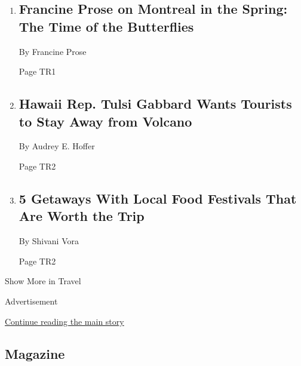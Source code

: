 \begin{enumerate}
\def\labelenumi{\arabic{enumi}.}
\item
  \href{/2018/06/11/travel/francine-prose-montreal-family-travel.html}{}

  \hypertarget{francine-prose-on-montreal-in-the-spring-the-time-of-the-butterflies}{%
  \subsection{Francine Prose on Montreal in the Spring: The Time of the
  Butterflies}\label{francine-prose-on-montreal-in-the-spring-the-time-of-the-butterflies}}

  By Francine Prose

  Page TR1
\item
  \href{/2018/06/05/travel/hawaii-gabbard-volcano.html}{}

  \hypertarget{hawaii-rep-tulsi-gabbard-wants-tourists-to-stay-away-from-volcano}{%
  \subsection{Hawaii Rep. Tulsi Gabbard Wants Tourists to Stay Away from
  Volcano}\label{hawaii-rep-tulsi-gabbard-wants-tourists-to-stay-away-from-volcano}}

  By Audrey E. Hoffer

  Page TR2
\item
  \href{/2018/06/13/travel/food-festivals-hotels.html}{}

  \hypertarget{5-getaways-with-local-food-festivals-that-are-worth-the-trip}{%
  \subsection{5 Getaways With Local Food Festivals That Are Worth the
  Trip}\label{5-getaways-with-local-food-festivals-that-are-worth-the-trip}}

  By Shivani Vora

  Page TR2
\end{enumerate}

Show More in Travel

Advertisement

\protect\hyperlink{after-mid5}{Continue reading the main story}

\hypertarget{magazine}{%
\subsection{Magazine}\label{magazine}}

